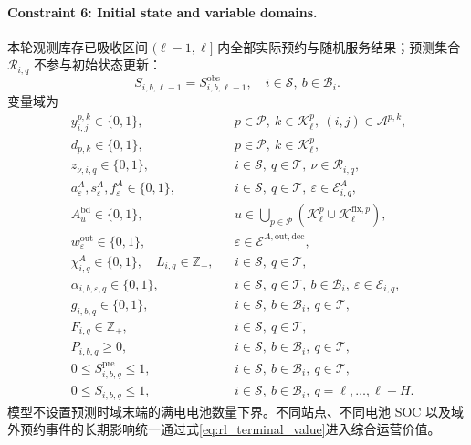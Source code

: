 \documentclass[12pt,a4paper,UTF8]{ctexart}
\begin{document}
\paragraph{Constraint 6: Initial state and variable domains.}
本轮观测库存已吸收区间 $(\ell-1,\ell]$ 内全部实际预约与随机服务结果；预测集合 $\mathcal R_{i,q}$ 不参与初始状态更新：
\begin{equation}
S_{i,b,\ell-1}
=
S_{i,b,\ell-1}^{\mathrm{obs}},
\quad i\in\mathcal S,\ b\in\mathcal B_i.
\label{eq:initial_battery_soc}
\end{equation}
变量域为
\begin{align}
&y_{i,j}^{p,k}\in\{0,1\},
&&p\in\mathcal P,\ k\in\mathcal K_\ell^p,\
(i,j)\in\mathcal A^{p,k},
\label{eq:binary_variables}\\
&d_{p,k}\in\{0,1\},
&&p\in\mathcal P,\ k\in\mathcal K_\ell^p,\\
&z_{\nu,i,q}\in\{0,1\},
&&i\in\mathcal S,\ q\in\mathcal T,\
\nu\in\mathcal R_{i,q},\\
&a_\varepsilon^A,s_\varepsilon^A,f_\varepsilon^A\in\{0,1\},
&&i\in\mathcal S,\ q\in\mathcal T,\
\varepsilon\in\mathcal E_{i,q}^{A},\\
&A_u^{\mathrm{bd}}\in\{0,1\},
&&u\in\bigcup_{p\in\mathcal P}
\left(\mathcal K_\ell^p\cup\mathcal K_\ell^{\mathrm{fix},p}\right),\\
&w_\varepsilon^{\mathrm{out}}\in\{0,1\},
&&\varepsilon\in\mathcal E^{A,\mathrm{out},\mathrm{dec}},\\
&\chi_{i,q}^A\in\{0,1\},\quad L_{i,q}\in\mathbb Z_+,
&&i\in\mathcal S,\ q\in\mathcal T,\\
&\alpha_{i,b,\varepsilon,q}\in\{0,1\},
&&i\in\mathcal S,\ q\in\mathcal T,\
b\in\mathcal B_i,\ \varepsilon\in\mathcal E_{i,q},\\
&g_{i,b,q}\in\{0,1\},
&&i\in\mathcal S,\ b\in\mathcal B_i,\ q\in\mathcal T,\\
&F_{i,q}\in\mathbb Z_+,
&&i\in\mathcal S,\ q\in\mathcal T,\\
&P_{i,b,q}\ge0,
&&i\in\mathcal S,\ b\in\mathcal B_i,\ q\in\mathcal T,\\
&0\le S_{i,b,q}^{\mathrm{pre}}\le1,
&&i\in\mathcal S,\ b\in\mathcal B_i,\ q\in\mathcal T,\\
&0\le S_{i,b,q}\le1,
&&i\in\mathcal S,\ b\in\mathcal B_i,\ q=\ell,\ldots,\ell+H.
\label{eq:continuous_soc_domains}
\end{align}
模型不设置预测时域末端的满电电池数量下界。不同站点、不同电池 SOC 以及域外预约事件的长期影响统一通过式\eqref{eq:rl_terminal_value}进入综合运营价值。
\end{document}
